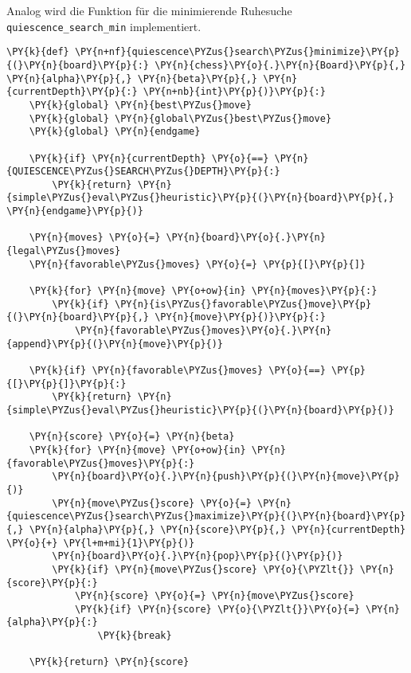     Analog wird die Funktion für die minimierende Ruhesuche
\texttt{quiescence\_search\_min} implementiert.

\bigskip

    \begin{tcolorbox}[fontupper=\linespread{.66}\selectfont, breakable, size=fbox, boxrule=1pt, pad at break*=1mm,colback=cellbackground, colframe=cellborder]
\begin{Verbatim}[commandchars=\\\{\}]
\PY{k}{def} \PY{n+nf}{quiescence\PYZus{}search\PYZus{}minimize}\PY{p}{(}\PY{n}{board}\PY{p}{:} \PY{n}{chess}\PY{o}{.}\PY{n}{Board}\PY{p}{,} \PY{n}{alpha}\PY{p}{,} \PY{n}{beta}\PY{p}{,} \PY{n}{currentDepth}\PY{p}{:} \PY{n+nb}{int}\PY{p}{)}\PY{p}{:}
    \PY{k}{global} \PY{n}{best\PYZus{}move}
    \PY{k}{global} \PY{n}{global\PYZus{}best\PYZus{}move}
    \PY{k}{global} \PY{n}{endgame}

    \PY{k}{if} \PY{n}{currentDepth} \PY{o}{==} \PY{n}{QUIESCENCE\PYZus{}SEARCH\PYZus{}DEPTH}\PY{p}{:}
        \PY{k}{return} \PY{n}{simple\PYZus{}eval\PYZus{}heuristic}\PY{p}{(}\PY{n}{board}\PY{p}{,} \PY{n}{endgame}\PY{p}{)}

    \PY{n}{moves} \PY{o}{=} \PY{n}{board}\PY{o}{.}\PY{n}{legal\PYZus{}moves}
    \PY{n}{favorable\PYZus{}moves} \PY{o}{=} \PY{p}{[}\PY{p}{]}

    \PY{k}{for} \PY{n}{move} \PY{o+ow}{in} \PY{n}{moves}\PY{p}{:}
        \PY{k}{if} \PY{n}{is\PYZus{}favorable\PYZus{}move}\PY{p}{(}\PY{n}{board}\PY{p}{,} \PY{n}{move}\PY{p}{)}\PY{p}{:}
            \PY{n}{favorable\PYZus{}moves}\PY{o}{.}\PY{n}{append}\PY{p}{(}\PY{n}{move}\PY{p}{)}

    \PY{k}{if} \PY{n}{favorable\PYZus{}moves} \PY{o}{==} \PY{p}{[}\PY{p}{]}\PY{p}{:}
        \PY{k}{return} \PY{n}{simple\PYZus{}eval\PYZus{}heuristic}\PY{p}{(}\PY{n}{board}\PY{p}{)}

    \PY{n}{score} \PY{o}{=} \PY{n}{beta}
    \PY{k}{for} \PY{n}{move} \PY{o+ow}{in} \PY{n}{favorable\PYZus{}moves}\PY{p}{:}
        \PY{n}{board}\PY{o}{.}\PY{n}{push}\PY{p}{(}\PY{n}{move}\PY{p}{)}
        \PY{n}{move\PYZus{}score} \PY{o}{=} \PY{n}{quiescence\PYZus{}search\PYZus{}maximize}\PY{p}{(}\PY{n}{board}\PY{p}{,} \PY{n}{alpha}\PY{p}{,} \PY{n}{score}\PY{p}{,} \PY{n}{currentDepth} \PY{o}{+} \PY{l+m+mi}{1}\PY{p}{)}
        \PY{n}{board}\PY{o}{.}\PY{n}{pop}\PY{p}{(}\PY{p}{)}
        \PY{k}{if} \PY{n}{move\PYZus{}score} \PY{o}{\PYZlt{}} \PY{n}{score}\PY{p}{:}
            \PY{n}{score} \PY{o}{=} \PY{n}{move\PYZus{}score}
            \PY{k}{if} \PY{n}{score} \PY{o}{\PYZlt{}}\PY{o}{=} \PY{n}{alpha}\PY{p}{:}
                \PY{k}{break}

    \PY{k}{return} \PY{n}{score}
\end{Verbatim}
\end{tcolorbox}

